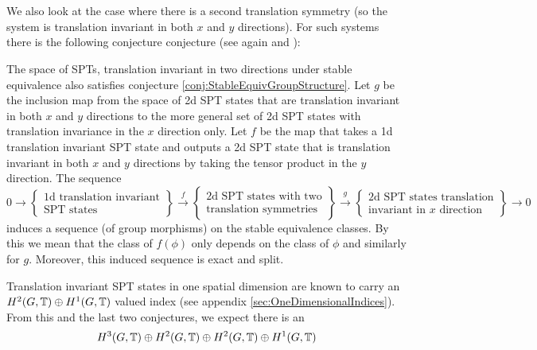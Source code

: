 \documentclass[11pt,a4paper,twoside]{article}
\numberwithin{equation}{section}
\begin{document}
\\\\
We also look at the case where there is a second translation symmetry (so the system is translation invariant in both $x$ and $y$ directions). For such systems there is the following conjecture conjecture (see again \cite{xiong2019classification} and \cite{Chen_2013}):
\begin{conjecture}\label{conj2}
	The space of SPTs, translation invariant in two directions under stable equivalence also satisfies conjecture \ref{conj:StableEquivGroupStructure}. Let $g$ be the inclusion map from the space of 2d SPT states that are translation invariant in both $x$ and $y$ directions to the more general set of 2d SPT states with translation invariance in the $x$ direction only. Let $f$ be the map that takes a 1d translation invariant SPT state and outputs a 2d SPT state that is translation invariant in both $x$ and $y$ directions by taking the tensor product in the $y$ direction. The sequence
	\begin{equation}
		0\rightarrow\left\{\begin{matrix}\text{1d translation invariant}\\ \text{SPT states}\end{matrix}\right\}\stackrel{f}{\rightarrow}\left\{\begin{matrix}\text{2d SPT states with two}\\ \text{translation symmetries}\end{matrix}\right\}\stackrel{g}{\rightarrow}\left\{\begin{matrix}\text{2d SPT states translation}\\ \text{invariant in $x$ direction}\end{matrix}\right\}\rightarrow 0
	\end{equation}
	induces a sequence (of group morphisms) on the stable equivalence classes. By this we mean that the class of $f(\phi)$ only depends on the class of $\phi$ and similarly for $g$. Moreover, this induced sequence is exact and split.
\end{conjecture}
Translation invariant SPT states in one spatial dimension are known to carry an $H^2(G,\mathbb T)\oplus H^1(G,\mathbb T)$ valued index (see appendix \ref{sec:OneDimensionalIndices}). From this and the last two conjectures, we expect there is an
\begin{equation}\label{eq:2TranslationsIntroduction}
	H^3(G,\mathbb T)\oplus H^2(G,\mathbb T)\oplus H^2(G,\mathbb T)\oplus H^1(G,\mathbb T)
\end{equation}
\end{document}
